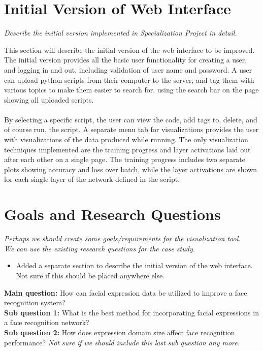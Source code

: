 \section{Initial Version of Web Interface}

\textit{Describe the initial version implemented in Specialization Project in detail.}

\noindent This section will describe the initial version of the web interface to be improved. \\

\noindent The initial version provides all the basic user functionality for creating a user, and logging in and out, including validation of user name and password. A user can upload python scripts from their computer to the server, and tag them with various topics to make them easier to search for, using the search bar on the page showing all uploaded scripts. \\ \\
\noindent By selecting a specific script, the user can view the code, add tags to, delete, and of course run, the script. A separate menu tab for visualizations provides the user with visualizations of the data produced while running. The only visualization techniques implemented are the training progress and layer activations laid out after each other on a single page. The training progress includes two separate plots showing accuracy and loss over batch, while the layer activations are shown for each single layer of the network defined in the script.

\section{Goals and Research Questions}

\textit{Perhaps we should create some goals/requirements for the visualization tool. \\
We can use the existing research questions for the case study.}

\begin{itemize}
    \item Added a separate section to describe the initial version of the web interface. Not sure if this should be placed anywhere else.
\end{itemize}

\noindent\textbf{Main question:} How can facial expression data be utilized to improve a face recognition system? \\
\textbf{Sub question 1:} What is the best method for incorporating facial expressions in a face recognition network? \\
\textbf{Sub question 2:} How does expression domain size affect face recognition performance? \textit{Not sure if we should include this last sub question any more.}

